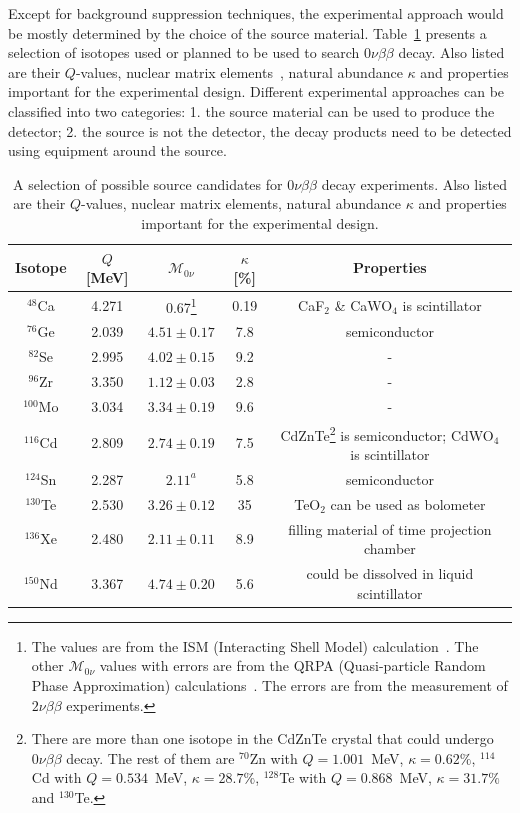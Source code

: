 Except for background suppression techniques, the experimental approach would be mostly determined by the choice of the source material. Table~\ref{tab:gerda:iso} presents a selection of isotopes used or planned to be used to search $0\nu\beta\beta$ decay. Also listed are their $Q$-values, nuclear matrix elements~\cite{Mut90, Rod07, Sim08, Cau08}, natural abundance $\kappa$ and properties important for the experimental design. Different experimental approaches can be classified into two categories: 1. the source material can be used to produce the detector; 2. the source is not the detector, the decay products need to be detected using equipment around the source.
\begin{table}[htbp]
  \centering
  \caption{A selection of possible source candidates for         $0\nu\beta\beta$ decay experiments. Also listed are their $Q$-values,     nuclear matrix elements, natural abundance $\kappa$ and properties     important for the experimental design.}
  \label{tab:gerda:iso}
  \begin{minipage}{\linewidth}
    \begin{tabular}{ccccc} \hline Isotope & $Q$ [MeV] &       $\mathcal{M}_{0\nu}$ & $\kappa$ [\%] & Properties \\\hline       $^{48}$Ca & 4.271 & 0.67\footnote{The values are from the ISM         (Interacting Shell Model) calculation~\cite{Cau08}.  The other         $\mathcal{M}_{0\nu}$ values with errors are from the QRPA         (Quasi-particle Random Phase Approximation)         calculations~\cite{Rod07}. The errors are from the measurement         of $2\nu\beta\beta$ experiments.} & 0.19 & CaF$_{2}$ \&       CaWO$_{4}$ is scintillator \\
      $^{76}$Ge & 2.039 & $4.51 \pm 0.17$ & 7.8 & semiconductor \\
      $^{82}$Se & 2.995 & $4.02 \pm 0.15$ & 9.2 & - \\
      $^{96}$Zr & 3.350 & $1.12 \pm 0.03$ & 2.8 & - \\
      $^{100}$Mo & 3.034 & $3.34 \pm 0.19$ & 9.6 & - \\
      $^{116}$Cd & 2.809 & $2.74 \pm 0.19$ & 7.5 &       CdZnTe\footnote{There are more than one isotope in the CdZnTe         crystal that could undergo $0\nu\beta\beta$ decay. The rest of         them are $^{70}$Zn with $Q = 1.001$~MeV, $\kappa = 0.62\%$,         $^{114}$Cd with $Q = 0.534$~MeV, $\kappa = 28.7\%$, $^{128}$Te         with $Q = 0.868$~MeV, $\kappa = 31.7\%$ and $^{130}$Te.} is       semiconductor; CdWO$_{4}$ is scintillator\\
      $^{124}$Sn & 2.287 & $2.11^{a}$ & 5.8 & semiconductor \\
      $^{130}$Te & 2.530 & $3.26 \pm 0.12$ & 35 & TeO$_{2}$ can be       used as bolometer\\
      $^{136}$Xe & 2.480 & $2.11 \pm 0.11$ & 8.9 & filling material of       time projection chamber\\
      $^{150}$Nd & 3.367 & $4.74 \pm 0.20$ & 5.6 & could be dissolved       in liquid scintillator\\
    \end{tabular}
  \end{minipage}
\end{table}

